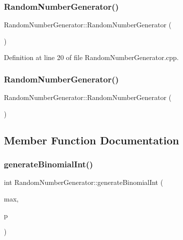 \subsubsection{RandomNumberGenerator()\hspace{0.1cm}{\footnotesize\ttfamily [1/2]}}
{\footnotesize\ttfamily Random\+Number\+Generator\+::\+Random\+Number\+Generator (\begin{DoxyParamCaption}{ }\end{DoxyParamCaption})\hspace{0.3cm}{\ttfamily [private]}}



Definition at line 20 of file Random\+Number\+Generator.\+cpp.

\mbox{\label{class_random_number_generator_a0007ec836f6bb43c27e2082264189c4c}} 
\subsubsection{RandomNumberGenerator()\hspace{0.1cm}{\footnotesize\ttfamily [2/2]}}
{\footnotesize\ttfamily Random\+Number\+Generator\+::\+Random\+Number\+Generator (\begin{DoxyParamCaption}\item[{const \textbf{ Random\+Number\+Generator} \&}]{ }\end{DoxyParamCaption})\hspace{0.3cm}{\ttfamily [private]}}



\subsection{Member Function Documentation}
\mbox{\label{class_random_number_generator_afb806d9e587e8ce8e061d27791f82c04}} 
\subsubsection{generateBinomialInt()\hspace{0.1cm}{\footnotesize\ttfamily [1/2]}}
{\footnotesize\ttfamily int Random\+Number\+Generator\+::generate\+Binomial\+Int (\begin{DoxyParamCaption}\item[{int}]{max,  }\item[{double}]{p }\end{DoxyParamCaption})}




